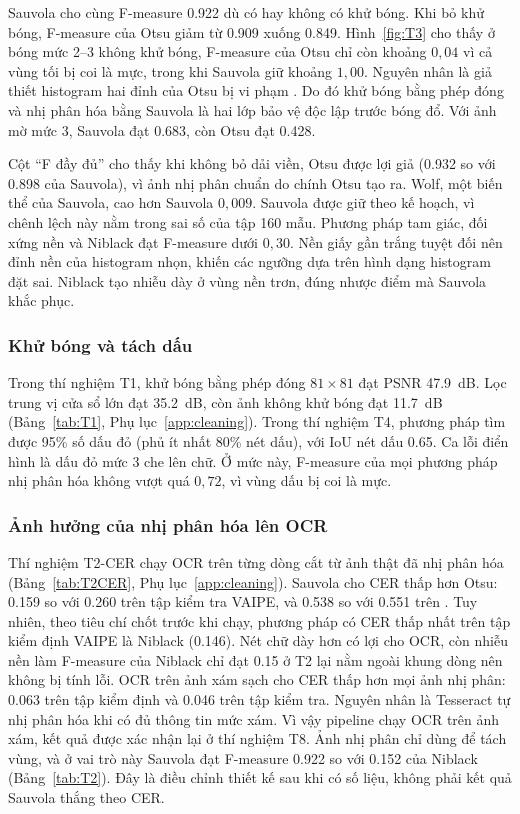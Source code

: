 Sauvola cho cùng F-measure \num{0.922} dù có hay không có khử bóng.
Khi bỏ khử bóng, F-measure của Otsu giảm từ \num{0.909} xuống \num{0.849}.
Hình~\ref{fig:T3} cho thấy ở bóng mức 2--3 không khử bóng, F-measure của Otsu chỉ còn khoảng $0{,}04$ vì cả vùng tối bị coi là mực, trong khi Sauvola giữ khoảng $1{,}00$.
Nguyên nhân là giả thiết histogram hai đỉnh của Otsu bị vi phạm .
Do đó khử bóng bằng phép đóng và nhị phân hóa bằng Sauvola là hai lớp bảo vệ độc lập trước bóng đổ.
Với ảnh mờ mức 3, Sauvola đạt \num{0.683}, còn Otsu đạt \num{0.428}.

Cột ``F đầy đủ'' cho thấy khi không bỏ dải viền, Otsu được lợi giả (\num{0.932} so với \num{0.898} của Sauvola), vì ảnh nhị phân chuẩn do chính Otsu tạo ra.
Wolf, một biến thể của Sauvola, cao hơn Sauvola $0{,}009$.
Sauvola được giữ theo kế hoạch, vì chênh lệch này nằm trong sai số của tập 160 mẫu.
Phương pháp tam giác, đối xứng nền và Niblack đạt F-measure dưới $0{,}30$.
Nền giấy gần trắng tuyệt đối nên đỉnh nền của histogram nhọn, khiến các ngưỡng dựa trên hình dạng histogram đặt sai.
Niblack tạo nhiễu dày ở vùng nền trơn, đúng nhược điểm mà Sauvola khắc phục.

\subsubsection{Khử bóng và tách dấu}
Trong thí nghiệm T1, khử bóng bằng phép đóng $81\times81$ đạt PSNR \SI{47.9}{dB}.
Lọc trung vị cửa sổ lớn đạt \SI{35.2}{dB}, còn ảnh không khử bóng đạt \SI{11.7}{dB} (Bảng~\ref{tab:T1}, Phụ lục~\ref{app:cleaning}).
Trong thí nghiệm T4, phương pháp tìm được 95\% số dấu đỏ (phủ ít nhất 80\% nét dấu), với IoU nét dấu \num{0.65}.
Ca lỗi điển hình là dấu đỏ mức 3 che lên chữ.
Ở mức này, F-measure của mọi phương pháp nhị phân hóa không vượt quá $0{,}72$, vì vùng dấu bị coi là mực.

\subsubsection{Ảnh hưởng của nhị phân hóa lên OCR}
Thí nghiệm T2-CER chạy OCR trên từng dòng cắt từ ảnh thật đã nhị phân hóa (Bảng~\ref{tab:T2CER}, Phụ lục~\ref{app:cleaning}).
Sauvola cho CER thấp hơn Otsu: \num{0.159} so với \num{0.260} trên tập kiểm tra VAIPE, và \num{0.538} so với \num{0.551} trên .
Tuy nhiên, theo tiêu chí chốt trước khi chạy, phương pháp có CER thấp nhất trên tập kiểm định VAIPE là Niblack (\num{0.146}).
Nét chữ dày hơn có lợi cho OCR, còn nhiễu nền làm F-measure của Niblack chỉ đạt \num{0.15} ở T2 lại nằm ngoài khung dòng nên không bị tính lỗi.
OCR trên ảnh xám sạch cho CER thấp hơn mọi ảnh nhị phân: \num{0.063} trên tập kiểm định và \num{0.046} trên tập kiểm tra.
Nguyên nhân là Tesseract tự nhị phân hóa khi có đủ thông tin mức xám.
Vì vậy pipeline chạy OCR trên ảnh xám, kết quả được xác nhận lại ở thí nghiệm T8.
Ảnh nhị phân chỉ dùng để tách vùng, và ở vai trò này Sauvola đạt F-measure \num{0.922} so với \num{0.152} của Niblack (Bảng~\ref{tab:T2}).
Đây là điều chỉnh thiết kế sau khi có số liệu, không phải kết quả Sauvola thắng theo CER.

